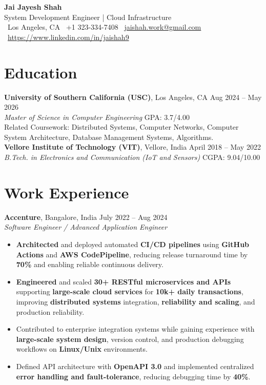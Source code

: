 \documentclass[letterpaper,11pt]{article}
\begin{document}
\begin{center}
    {\LARGE \textbf{Jai Jayesh Shah}}\\
    {\normalsize System Development Engineer | Cloud Infrastructure}\\
    \small
    \faMapMarker*\ Los Angeles, CA
    \quad
    \faPhone*\ +1 323-334-7408
    \quad
    \faEnvelope\ \href{mailto:jaishah.work@gmail.com}{jaishah.work@gmail.com}
    \quad
    \faLinkedin\ \href{https://www.linkedin.com/in/jaishah9}{https://www.linkedin.com/in/jaishah9}
\end{center}
\vspace{-13pt}

\section*{Education}
\textbf{University of Southern California (USC)}, Los Angeles, CA \hfill Aug 2024 -- May 2026 \\
\textit{Master of Science in Computer Engineering} \hfill GPA: 3.7/4.00 \\
Related Coursework: Distributed Systems, Computer Networks, Computer System Architecture, Database Management Systems, Algorithms. \\
\textbf{Vellore Institute of Technology (VIT)}, Vellore, India \hfill April 2018 -- May 2022 \\
\textit{B.Tech. in Electronics and Communication (IoT and Sensors)} \hfill CGPA: 9.04/10.00 \\

\section*{Work Experience}
\textbf{Accenture}, Bangalore, India \hfill July 2022 -- Aug 2024 \\
\textit{Software Engineer / Advanced Application Engineer}
\begin{itemize}
    \item \textbf{Architected} and deployed automated \textbf{CI/CD pipelines} using \textbf{GitHub Actions} and \textbf{AWS CodePipeline}, reducing release turnaround time by \textbf{70\%} and enabling reliable continuous delivery.
    \item \textbf{Engineered} and scaled \textbf{30+ RESTful microservices and APIs} supporting \textbf{large-scale cloud services} for \textbf{10k+ daily transactions}, improving \textbf{distributed systems} integration, \textbf{reliability and scaling}, and production reliability.
    \item Contributed to enterprise integration systems while gaining experience with \textbf{large-scale system design}, version control, and production debugging workflows on \textbf{Linux/Unix} environments.
    \item Defined API architecture with \textbf{OpenAPI 3.0} and implemented centralized \textbf{error handling and fault-tolerance}, reducing debugging time by \textbf{40\%}.
\end{itemize}
\end{document}
